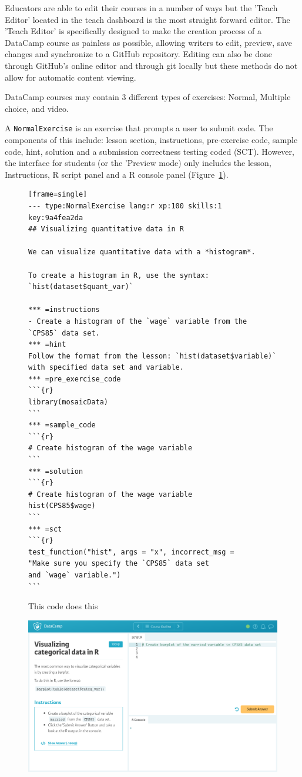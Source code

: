 \documentclass[12pt]{article}
\begin{document}
Educators are able to edit their courses in a number of ways but the 'Teach Editor' located in the teach dashboard is the
most straight forward editor. The 'Teach Editor' is specifically designed to make the creation process of a DataCamp course
as painless as possible, allowing writers to edit, preview, save changes and synchronize to a GitHub repository. Editing can
also be done through GitHub's online editor and through git locally but these methods do not allow for automatic content
viewing.

DataCamp courses may contain 3 different types of exercises: Normal, Multiple choice, and video.

A \texttt{NormalExercise} is an exercise that prompts a user to submit code. The components of this include: lesson section, instructions, pre-exercise code, sample code, hint, solution and a submission correctness testing coded (SCT). However, the interface for students (or the 'Preview
mode) only includes the lesson, Instructions, R script panel and a R console panel (Figure~\ref{fig:code1}).


\begin{figure}
\caption{This code does this}
\begin{verbatim}[frame=single]
--- type:NormalExercise lang:r xp:100 skills:1 key:9a4fea2da
## Visualizing quantitative data in R

We can visualize quantitative data with a *histogram*.

To create a histogram in R, use the syntax:
`hist(dataset$quant_var)`

*** =instructions
- Create a histogram of the `wage` variable from the 
`CPS85` data set.
*** =hint
Follow the format from the lesson: `hist(dataset$variable)`
with specified data set and variable.
*** =pre_exercise_code
```{r}
library(mosaicData)
```
*** =sample_code
```{r}
# Create histogram of the wage variable
```
*** =solution
```{r}
# Create histogram of the wage variable 
hist(CPS85$wage)
```
*** =sct
```{r}
test_function("hist", args = "x", incorrect_msg = 
"Make sure you specify the `CPS85` data set
and `wage` variable.")
```

\end{verbatim}
\label{fig:code1}
\end{figure}

\begin{figure}[h]
  \includegraphics[scale = 0.19] {preview.jpg}
\end{figure}
\end{document}
